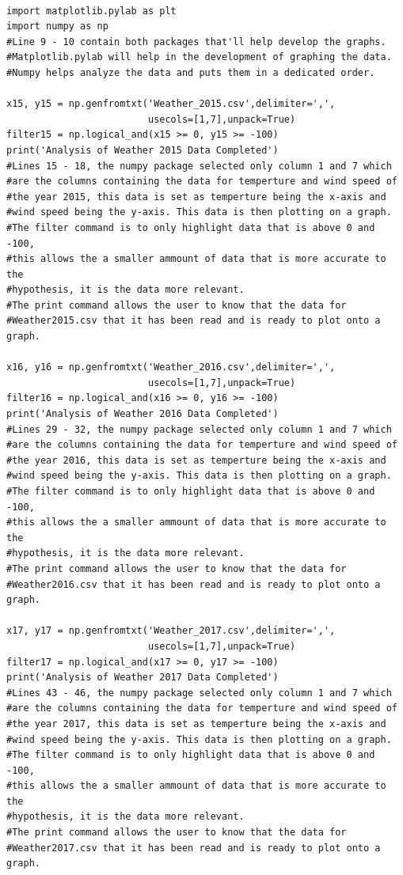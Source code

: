 \documentclass[12pt]{article}
\begin{document}
\begin{verbatim}

import matplotlib.pylab as plt
import numpy as np
#Line 9 - 10 contain both packages that'll help develop the graphs.
#Matplotlib.pylab will help in the development of graphing the data.
#Numpy helps analyze the data and puts them in a dedicated order.

x15, y15 = np.genfromtxt('Weather_2015.csv',delimiter=',',
                         usecols=[1,7],unpack=True)
filter15 = np.logical_and(x15 >= 0, y15 >= -100)
print('Analysis of Weather 2015 Data Completed')
#Lines 15 - 18, the numpy package selected only column 1 and 7 which 
#are the columns containing the data for temperture and wind speed of
#the year 2015, this data is set as temperture being the x-axis and 
#wind speed being the y-axis. This data is then plotting on a graph.
#The filter command is to only highlight data that is above 0 and -100,
#this allows the a smaller ammount of data that is more accurate to the
#hypothesis, it is the data more relevant.
#The print command allows the user to know that the data for
#Weather2015.csv that it has been read and is ready to plot onto a graph.

x16, y16 = np.genfromtxt('Weather_2016.csv',delimiter=',',
                         usecols=[1,7],unpack=True)
filter16 = np.logical_and(x16 >= 0, y16 >= -100)
print('Analysis of Weather 2016 Data Completed')
#Lines 29 - 32, the numpy package selected only column 1 and 7 which 
#are the columns containing the data for temperture and wind speed of
#the year 2016, this data is set as temperture being the x-axis and 
#wind speed being the y-axis. This data is then plotting on a graph.
#The filter command is to only highlight data that is above 0 and -100,
#this allows the a smaller ammount of data that is more accurate to the
#hypothesis, it is the data more relevant.
#The print command allows the user to know that the data for
#Weather2016.csv that it has been read and is ready to plot onto a graph.

x17, y17 = np.genfromtxt('Weather_2017.csv',delimiter=',',
                         usecols=[1,7],unpack=True)
filter17 = np.logical_and(x17 >= 0, y17 >= -100)
print('Analysis of Weather 2017 Data Completed')
#Lines 43 - 46, the numpy package selected only column 1 and 7 which 
#are the columns containing the data for temperture and wind speed of
#the year 2017, this data is set as temperture being the x-axis and 
#wind speed being the y-axis. This data is then plotting on a graph.
#The filter command is to only highlight data that is above 0 and -100,
#this allows the a smaller ammount of data that is more accurate to the
#hypothesis, it is the data more relevant.
#The print command allows the user to know that the data for
#Weather2017.csv that it has been read and is ready to plot onto a graph.


\end{verbatim}
\end{document}
